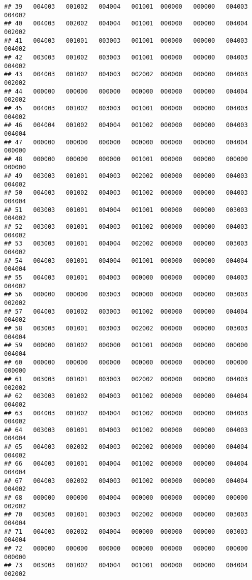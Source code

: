 \documentclass[
]{article}
\begin{document}
\begin{verbatim}
## 39   004003   001002   004004   001001  000000   000000   004003   004002
## 40   004003   002002   004004   001001  000000   000000   004004   002002
## 41   004003   001001   003003   001001  000000   000000   004003   004002
## 42   003003   001002   003003   001001  000000   000000   004003   004002
## 43   004003   001002   004003   002002  000000   000000   004003   002002
## 44   000000   000000   000000   000000  000000   000000   004004   002002
## 45   004003   001002   003003   001001  000000   000000   004003   004002
## 46   004004   001002   004004   001002  000000   000000   004003   004004
## 47   000000   000000   000000   000000  000000   000000   004004   000000
## 48   000000   000000   000000   001001  000000   000000   000000   000000
## 49   003003   001001   004003   002002  000000   000000   004003   004002
## 50   004003   001002   004003   001002  000000   000000   004003   004004
## 51   003003   001001   004004   001001  000000   000000   003003   004002
## 52   003003   001001   004003   001002  000000   000000   004003   004002
## 53   003003   001001   004004   002002  000000   000000   003003   004002
## 54   004003   001001   004004   001001  000000   000000   004004   004004
## 55   004003   001001   004003   000000  000000   000000   004003   004002
## 56   000000   000000   003003   000000  000000   000000   003003   002002
## 57   004003   001002   003003   001002  000000   000000   004004   004002
## 58   003003   001001   003003   002002  000000   000000   003003   004004
## 59   000000   001002   000000   001001  000000   000000   000000   004004
## 60   000000   000000   000000   000000  000000   000000   000000   000000
## 61   003003   001001   003003   002002  000000   000000   004003   002002
## 62   003003   001002   004003   001002  000000   000000   004004   004002
## 63   004003   001002   004004   001002  000000   000000   004003   004002
## 64   003003   001001   004003   001002  000000   000000   004003   004004
## 65   004003   002002   004003   002002  000000   000000   004004   004002
## 66   004003   001001   004004   001002  000000   000000   004004   004004
## 67   004003   002002   004003   001002  000000   000000   004004   004002
## 68   000000   000000   004004   000000  000000   000000   000000   002002
## 70   003003   001001   003003   002002  000000   000000   003003   004004
## 71   004003   002002   004004   000000  000000   000000   003003   004004
## 72   000000   000000   000000   000000  000000   000000   000000   000000
## 73   003003   001002   004004   001001  000000   000000   004004   002002

\end{verbatim}
\end{document}
